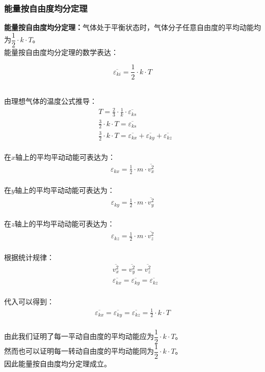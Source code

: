 \documentclass[UTF8]{ctexart}
\begin{document}
\subsubsection{能量按自由度均分定理}
    \setcounter{equation}{0}
    \textbf{能量按自由度均分定理：}气体处于平衡状态时，气体分子任意自由度的平均动能均为$\dfrac{1}{2}\cdot k\cdot T$。\\[3mm]
    能量按自由度均分定理的数学表达：
    \begin{large}
        \begin{equation*}
            \overline{\varepsilon_{ki}}=\frac{1}{2}\cdot k\cdot T
        \end{equation*}
    \end{large}\\
    由理想气体的温度公式推导：
    \begin{align}
        &T=\frac{2}{3}\cdot\frac{1}{k}\cdot\overline{\varepsilon_{ks}}\\[3mm]
        &\frac{3}{2}\cdot k\cdot T=\overline{\varepsilon_{ks}}\\[3mm]
        &\frac{3}{2}\cdot k\cdot T=\overline{\varepsilon_{kx}}+\overline{\varepsilon_{ky}}+\overline{\varepsilon_{kz}}
    \end{align}\\
    在$x$轴上的平均平动动能可表达为：
    \begin{align}
        \varepsilon_{kx}=\frac{1}{2}\cdot m\cdot\overline{v_x^2}
    \end{align}\\
    在$y$轴上的平均平动动能可表达为：
    \begin{align}
        \varepsilon_{ky}=\frac{1}{2}\cdot m\cdot\overline{v_y^2}
    \end{align}\\
    在$z$轴上的平均平动动能可表达为：
    \begin{align}
        \varepsilon_{kz}=\frac{1}{2}\cdot m\cdot\overline{v_z^2}
    \end{align}\\
    根据统计规律：
    \begin{align}
        &\overline{v_x^2}=\overline{v_y^2}=\overline{v_z^2}\\[3mm]
        &\overline{\varepsilon_{kx}}=\overline{\varepsilon_{ky}}=\overline{\varepsilon_{kz}}
    \end{align}\\
    代入可以得到：
    \begin{align}
        \overline{\varepsilon_{kx}}=\overline{\varepsilon_{ky}}=\overline{\varepsilon_{kz}}=\frac{1}{2}\cdot k\cdot T
    \end{align}\\
    由此我们证明了每一平动自由度的平均动能应为$\dfrac{1}{2}\cdot k\cdot T$。\\[3mm]
    然而也可以证明每一转动自由度的平均动能同为$\dfrac{1}{2}\cdot k\cdot T$。\\[3mm]
    因此能量按自由度均分定理成立。
\end{document}
